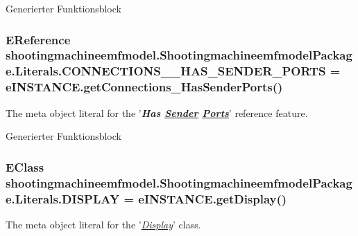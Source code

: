 Generierter Funktionsblock \hypertarget{interfaceshootingmachineemfmodel_1_1_shootingmachineemfmodel_package_1_1_literals_a358f29496a0fad25e398d9a212e455a1}{
\subsubsection[{C\-O\-N\-N\-E\-C\-T\-I\-O\-N\-S\-\_\-\-\_\-\-H\-A\-S\-\_\-\-S\-E\-N\-D\-E\-R\-\_\-\-P\-O\-R\-T\-S}]{\setlength{\rightskip}{0pt plus 5cm}E\-Reference shootingmachineemfmodel.\-Shootingmachineemfmodel\-Package.\-Literals.\-C\-O\-N\-N\-E\-C\-T\-I\-O\-N\-S\-\_\-\-\_\-\-H\-A\-S\-\_\-\-S\-E\-N\-D\-E\-R\-\_\-\-P\-O\-R\-T\-S = e\-I\-N\-S\-T\-A\-N\-C\-E.\-get\-Connections\-\_\-\-Has\-Sender\-Ports()}}\label{interfaceshootingmachineemfmodel_1_1_shootingmachineemfmodel_package_1_1_literals_a358f29496a0fad25e398d9a212e455a1}
The meta object literal for the '{\itshape {\bfseries Has \hyperlink{interfaceshootingmachineemfmodel_1_1_sender}{Sender} \hyperlink{interfaceshootingmachineemfmodel_1_1_ports}{Ports}}}' reference feature.

Generierter Funktionsblock \hypertarget{interfaceshootingmachineemfmodel_1_1_shootingmachineemfmodel_package_1_1_literals_ab8f98900ea17ced20aa67f00e65df0ac}{
\subsubsection[{D\-I\-S\-P\-L\-A\-Y}]{\setlength{\rightskip}{0pt plus 5cm}E\-Class shootingmachineemfmodel.\-Shootingmachineemfmodel\-Package.\-Literals.\-D\-I\-S\-P\-L\-A\-Y = e\-I\-N\-S\-T\-A\-N\-C\-E.\-get\-Display()}}\label{interfaceshootingmachineemfmodel_1_1_shootingmachineemfmodel_package_1_1_literals_ab8f98900ea17ced20aa67f00e65df0ac}
The meta object literal for the '\hyperlink{classshootingmachineemfmodel_1_1impl_1_1_display_impl}{{\itshape Display}}' class.

